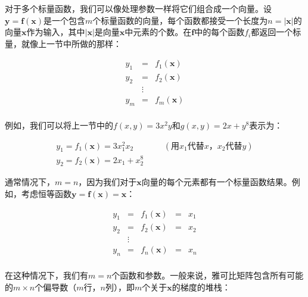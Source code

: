 \documentclass[11pt]{article}
\begin{document}
对于多个标量函数，我们可以像处理参数一样将它们组合成一个向量。设$\mathbf{y} = \mathbf{f}(\mathbf{x})$是一个包含$m$个标量函数的向量，每个函数都接受一个长度为$n=|\mathbf{x}|$的向量$\mathbf{x}$作为输入，其中$|\mathbf{x}|$是向量$\mathbf{x}$中元素的个数。在$\mathbf{f}$中的每个函数$f_i$都返回一个标量，就像上一节中所做的那样：

\[
\begin{array}{lcl}
 y_1 & = & f_1(\mathbf{x})\\
 y_2 & = & f_2(\mathbf{x})\\
 & \vdots & \\
 y_m & = & f_m(\mathbf{x})\\
\end{array}
\]

例如，我们可以将上一节中的$f(x, y) = 3x^2y$和$g(x, y) = 2x + y^8$表示为：

\[
\begin{array}{lllllllll}
 y_1 = f_1(\mathbf{x}) = 3x_1^2x_2  &&&(\text{用$x_1$代替$x$，$x_2$代替$y$})\\
 y_2 = f_2(\mathbf{x}) = 2x_1 + x_2^8
\end{array}
\]

通常情况下，$m = n$，因为我们对于$\mathbf{x}$向量的每个元素都有一个标量函数结果。例如，考虑恒等函数$\mathbf{y} = \mathbf{f(x)} = \mathbf{x}$：

\[
\begin{array}{lclcc}
 y_1 & = & f_1(\mathbf{x})& = & x_1\\
 y_2 & = & f_2(\mathbf{x})& = & x_2\\
 & \vdots & \\
 y_n & = & f_n(\mathbf{x})& = & x_n\\
\end{array}
\]

在这种情况下，我们有$m = n$个函数和参数。一般来说，雅可比矩阵包含所有可能的$m \times n$个偏导数（$m$行，$n$列），即$m$个关于$\mathbf{x}$的梯度的堆栈：
\end{document}

